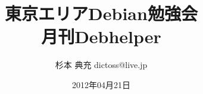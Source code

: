 




\documentclass[cjk,dvipdfmx,12pt]{beamer}
\usepackage{monthlypresentation}



\title{東京エリアDebian勉強会 \\月刊Debhelper}
\subtitle{}
\author{杉本 典充 dictoss@live.jp}
\date{2012年04月21日}



